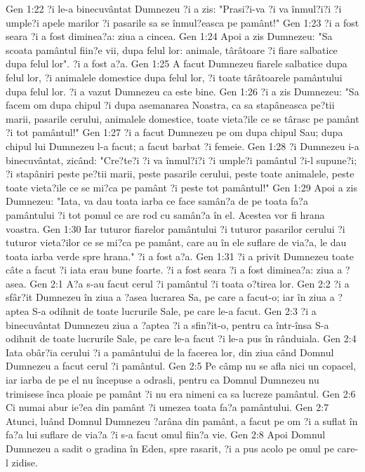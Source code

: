 Gen 1:22  ?i le-a binecuvântat Dumnezeu ?i a zis: "Prasi?i-va ?i va înmul?i?i ?i umple?i apele marilor ?i pasarile sa se înmul?easca pe pamânt!"
Gen 1:23  ?i a fost seara ?i a fost diminea?a: ziua a cincea.
Gen 1:24  Apoi a zis Dumnezeu: "Sa scoata pamântul fiin?e vii, dupa felul lor: animale, târâtoare ?i fiare salbatice dupa felul lor". ?i a fost a?a.
Gen 1:25  A facut Dumnezeu fiarele salbatice dupa felul lor, ?i animalele domestice dupa felul lor, ?i toate târâtoarele pamântului dupa felul lor. ?i a vazut Dumnezeu ca este bine.
Gen 1:26  ?i a zis Dumnezeu: "Sa facem om dupa chipul ?i dupa asemanarea Noastra, ca sa stapâneasca pe?tii marii, pasarile cerului, animalele domestice, toate vieta?ile ce se târasc pe pamânt ?i tot pamântul!"
Gen 1:27  ?i a facut Dumnezeu pe om dupa chipul Sau; dupa chipul lui Dumnezeu l-a facut; a facut barbat ?i femeie.
Gen 1:28  ?i Dumnezeu i-a binecuvântat, zicând: "Cre?te?i ?i va înmul?i?i ?i umple?i pamântul ?i-l supune?i; ?i stapâniri peste pe?tii marii, peste pasarile cerului, peste toate animalele, peste toate vieta?ile ce se mi?ca pe pamânt ?i peste tot pamântul!"
Gen 1:29  Apoi a zis Dumnezeu: "Iata, va dau toata iarba ce face samân?a de pe toata fa?a pamântului ?i tot pomul ce are rod cu samân?a în el. Acestea vor fi hrana voastra.
Gen 1:30  Iar tuturor fiarelor pamântului ?i tuturor pasarilor cerului ?i tuturor vieta?ilor ce se mi?ca pe pamânt, care au în ele suflare de via?a, le dau toata iarba verde spre hrana." ?i a fost a?a.
Gen 1:31  ?i a privit Dumnezeu toate câte a facut ?i iata erau bune foarte. ?i a fost seara ?i a fost diminea?a: ziua a ?asea.
Gen 2:1  A?a s-au facut cerul ?i pamântul ?i toata o?tirea lor.
Gen 2:2  ?i a sfâr?it Dumnezeu în ziua a ?asea lucrarea Sa, pe care a facut-o; iar în ziua a ?aptea S-a odihnit de toate lucrurile Sale, pe care le-a facut.
Gen 2:3  ?i a binecuvântat Dumnezeu ziua a ?aptea ?i a sfin?it-o, pentru ca într-însa S-a odihnit de toate lucrurile Sale, pe care le-a facut ?i le-a pus în rânduiala.
Gen 2:4  Iata obâr?ia cerului ?i a pamântului de la facerea lor, din ziua când Domnul Dumnezeu a facut cerul ?i pamântul.
Gen 2:5  Pe câmp nu se afla nici un copacel, iar iarba de pe el nu începuse a odrasli, pentru ca Domnul Dumnezeu nu trimisese înca ploaie pe pamânt ?i nu era nimeni ca sa lucreze pamântul.
Gen 2:6  Ci numai abur ie?ea din pamânt ?i umezea toata fa?a pamântului.
Gen 2:7  Atunci, luând Domnul Dumnezeu ?arâna din pamânt, a facut pe om ?i a suflat în fa?a lui suflare de via?a ?i s-a facut omul fiin?a vie.
Gen 2:8  Apoi Domnul Dumnezeu a sadit o gradina în Eden, spre rasarit, ?i a pus acolo pe omul pe care-l zidise.
